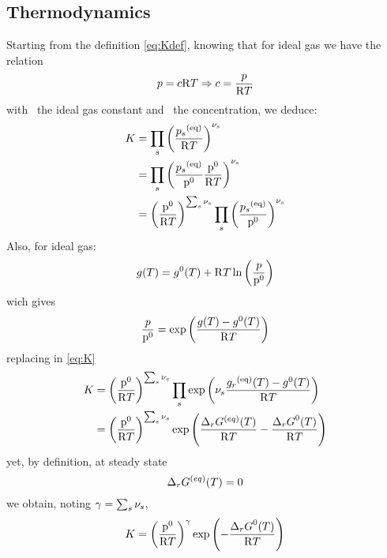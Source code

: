 \subsection{Thermodynamics}
\label{demo-eq_therm}

Starting from the definition \eqref{eq:Kdef}, knowing that
for ideal gas we have the relation
\begin{equation}
\press = \conc\Rg \Temp \Rightarrow \conc = \frac{\press}{\Rg \Temp}
\end{equation}
with \Rg\ the ideal gas constant and \conc\ the concentration, we
deduce:
\begin{equation}
\begin{split}
\Eqconst 
  & = \prod_s \left(\frac{\press[s]^{(\eq)}}{\Rg \Temp}\right)^{\scoef[s]} \\
  & = \prod_s \left(\frac{\press[s]^{(\eq)}}{\pz}\frac{\pz}{\Rg \Temp}\right)^{\scoef[s]} \\
  & = \left(\frac{\pz}{\Rg \Temp}\right)^{\sum_s\scoef[s]} \prod_s \left(\frac{\press[s]^{(\eq)}}{\pz}\right)^{\scoef[s]}
\label{eq:K}
\end{split}
\end{equation}
Also, for ideal gas:
\begin{equation}
\gibbs(\Temp) = \gibbsZ(\Temp) + \Rg \Temp \ln\left(\frac{\press}{\pz}\right)
\end{equation}
wich gives
\begin{equation}
\frac{\press}{\pz} = \exp\left(\frac{\gibbs(\Temp) - \gibbsZ(\Temp)}{\Rg \Temp}\right)
\end{equation}
replacing in \ref{eq:K}
\begin{equation}
\begin{split}
\Eqconst
  & = \left(\frac{\pz}{\Rg \Temp}\right)^{\sum_s\scoef[s]}
           \prod_s \exp\left(\scoef[s] \frac{\gibbs[r]^{(\eq)}(\Temp) - \gibbsZ(\Temp)}{\Rg \Temp}\right) \\
  & = \left(\frac{\pz}{\Rg \Temp}\right)^{\sum_s\scoef[s]} 
           \exp\left(\frac{\DGibbs[r]^{(eq)}(\Temp)}{\Rg \Temp} - \frac{\DGibbsZ[r](\Temp)}{\Rg \Temp}\right) \\
\end{split}
\end{equation}
yet, by definition, at steady state
\begin{equation}
\DGibbs[r]^{(eq)}(\Temp) = 0
\end{equation}
we obtain, noting $\gamma = \sum_s \scoef[s]$,
\begin{equation}
\Eqconst = \left(\frac{\pz}{\Rg \Temp}\right)^\gamma \exp\left(-\frac{\DGibbsZ[r](\Temp)}{\Rg \Temp}\right)
\end{equation}
